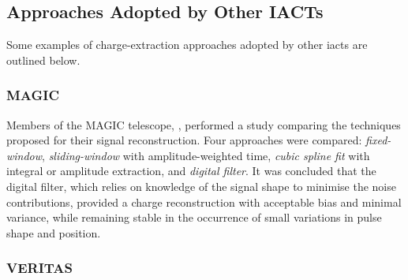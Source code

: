\subsection{Approaches Adopted by Other IACTs}

Some examples of charge-extraction approaches adopted by other \glspl{iact} are outlined below.

\subsubsection{MAGIC}

Members of the MAGIC telescope, \textcite{Albert2008}, performed a study comparing the techniques proposed for their signal reconstruction. Four approaches were compared: \textit{fixed-window}, \textit{sliding-window} with amplitude-weighted time, \textit{cubic spline fit} with integral or amplitude extraction, and \textit{digital filter}. It was concluded that the digital filter, which relies on knowledge of the signal shape to minimise the noise contributions, provided a charge reconstruction with acceptable bias and minimal variance, while remaining stable in the occurrence of small variations in pulse shape and position.

\subsubsection{VERITAS}

